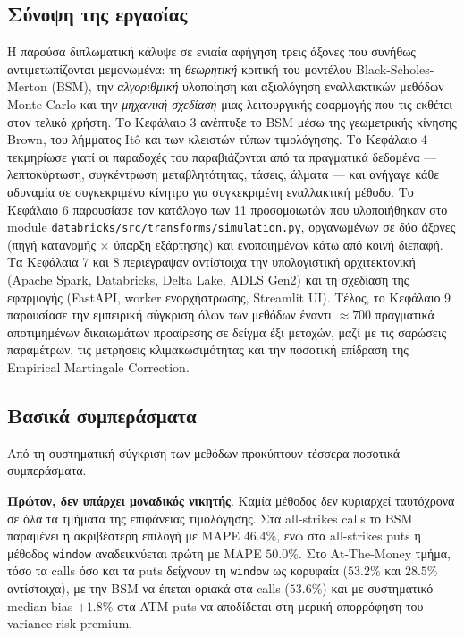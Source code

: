 \documentclass[12pt]{article}
\begin{document}
\subsection{Σύνοψη της εργασίας}
Η παρούσα διπλωματική κάλυψε σε ενιαία αφήγηση τρεις άξονες που συνήθως αντιμετωπίζονται μεμονωμένα: τη \emph{θεωρητική} κριτική του μοντέλου Black-Scholes-Merton (BSM), την \emph{αλγοριθμική} υλοποίηση και αξιολόγηση εναλλακτικών μεθόδων Monte Carlo και την \emph{μηχανική σχεδίαση} μιας λειτουργικής εφαρμογής που τις εκθέτει στον τελικό χρήστη. Το Κεφάλαιο 3 ανέπτυξε το BSM μέσω της γεωμετρικής κίνησης Brown, του λήμματος Itô και των κλειστών τύπων τιμολόγησης. Το Κεφάλαιο 4 τεκμηρίωσε γιατί οι παραδοχές του παραβιάζονται από τα πραγματικά δεδομένα — λεπτοκύρτωση, συγκέντρωση μεταβλητότητας, τάσεις, άλματα — και ανήγαγε κάθε αδυναμία σε συγκεκριμένο κίνητρο για συγκεκριμένη εναλλακτική μέθοδο. Το Κεφάλαιο 6 παρουσίασε τον κατάλογο των 11 προσομοιωτών που υλοποιήθηκαν στο module \texttt{databricks/src/transforms/simulation.py}, οργανωμένων σε δύο άξονες (πηγή κατανομής $\times$ ύπαρξη εξάρτησης) και ενοποιημένων κάτω από κοινή διεπαφή. Τα Κεφάλαια 7 και 8 περιέγραψαν αντίστοιχα την υπολογιστική αρχιτεκτονική (Apache Spark, Databricks, Delta Lake, ADLS Gen2) και τη σχεδίαση της εφαρμογής (FastAPI, worker ενορχήστρωσης, Streamlit UI). Τέλος, το Κεφάλαιο 9 παρουσίασε την εμπειρική σύγκριση όλων των μεθόδων έναντι $\approx 700$ πραγματικά αποτιμημένων δικαιωμάτων προαίρεσης σε δείγμα έξι μετοχών, μαζί με τις σαρώσεις παραμέτρων, τις μετρήσεις κλιμακωσιμότητας και την ποσοτική επίδραση της Empirical Martingale Correction.

\subsection{Βασικά συμπεράσματα}
Από τη συστηματική σύγκριση των μεθόδων προκύπτουν τέσσερα ποσοτικά συμπεράσματα.

\textbf{Πρώτον, δεν υπάρχει μοναδικός νικητής}. Καμία μέθοδος δεν κυριαρχεί ταυτόχρονα σε όλα τα τμήματα της επιφάνειας τιμολόγησης. Στα all-strikes calls το BSM παραμένει η ακριβέστερη επιλογή με MAPE $46.4\%$, ενώ στα all-strikes puts η μέθοδος \texttt{window} αναδεικνύεται πρώτη με MAPE $50.0\%$. Στο At-The-Money τμήμα, τόσο τα calls όσο και τα puts δείχνουν τη \texttt{window} ως κορυφαία ($53.2\%$ και $28.5\%$ αντίστοιχα), με την BSM να έπεται οριακά στα calls ($53.6\%$) και με συστηματικό median bias $+1.8\%$ στα ATM puts να αποδίδεται στη μερική απορρόφηση του variance risk premium.
\end{document}
